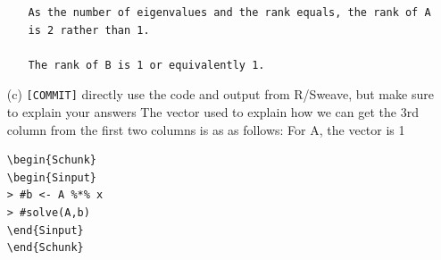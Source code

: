 \documentclass[12pt]{article}
\begin{document}
\begin{itemize}
\begin{itemize}
\begin{lstlisting}
As the number of eigenvalues and the rank equals, the rank of A is 2 rather than 1.

The rank of B is 1 or equivalently 1.
\end{lstlisting}
        \end{itemize}
    \item[(c)] \verb+[COMMIT]+   directly use the code and output from R/Sweave, but make sure
        to explain your answers
The vector used to explain how we can get the 3rd column from the first two columns is as as follows:
For A, the vector is 1
\begin{lstlisting}
\begin{Schunk}
\begin{Sinput}
> #b <- A %*% x
> #solve(A,b)
\end{Sinput}
\end{Schunk}
\end{lstlisting}
\end{itemize}
\end{document}
